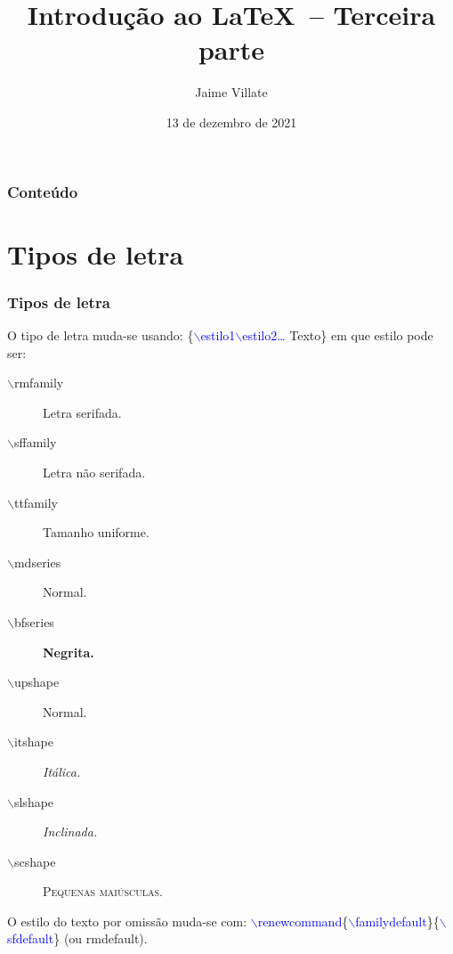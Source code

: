\documentclass{beamer}
\title{Introdução ao \LaTeX\ -- Terceira parte}
\author{Jaime Villate}
\institute[FEUP]{Faculdade de Engenharia da Universidade do Porto}
\date[13/12/2021]{13 de dezembro de 2021}
\begin{document}
\frame{\titlepage}
\begin{frame}
\frametitle{Conteúdo}
\tableofcontents
\end{frame}
\section{Tipos de letra}
\begin{frame}
\frametitle{Tipos de letra}
O tipo de letra muda-se usando:
\{\textcolor{blue}{$\backslash$estilo1$\backslash$estilo2\ldots} Texto\}
em que estilo pode ser:\pause
\begin{description}
\item[$\backslash$rmfamily] {\rmfamily Letra serifada.}\pause
\item[$\backslash$sffamily] {\sffamily Letra não serifada.}\pause
\item[$\backslash$ttfamily] {\ttfamily Tamanho uniforme.}\pause
\item[$\backslash$mdseries] {\mdseries Normal.}\pause
\item[$\backslash$bfseries] {\bfseries Negrita.}\pause
\item[$\backslash$upshape] {\upshape Normal.}\pause
\item[$\backslash$itshape] {\rmfamily\itshape Itálica.}\pause
\item[$\backslash$slshape] {\slshape Inclinada.}\pause
\item[$\backslash$scshape] {\rmfamily\scshape Pequenas maiúsculas.}\pause
\end{description}

O estilo do texto por omissão muda-se com:
\textcolor{blue}{$\backslash$renewcommand}\{\textcolor{blue}{$\backslash$familydefault}\}\{\textcolor{blue}{$\backslash$sfdefault}\} (ou rmdefault).

\end{frame}
\end{document}

